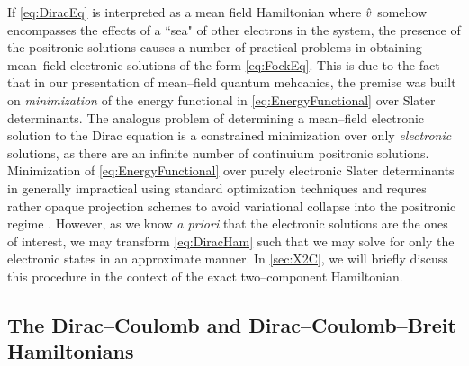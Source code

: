 If \cref{eq:DiracEq} is interpreted as a mean field Hamiltonian where $\hat{v}$ somehow encompasses
the effects of a ``sea" of other electrons in the system, the presence of the positronic solutions
causes a number of practical problems in obtaining mean--field electronic solutions of the form
\cref{eq:FockEq}. This is due to the fact that in our presentation of mean--field quantum mehcanics,
the premise was built on \emph{minimization} of the energy functional in \cref{eq:EnergyFunctional}
over Slater determinants. The analogus problem of determining a mean--field electronic solution
to the Dirac equation is a constrained minimization over only \emph{electronic} solutions, 
as there are an infinite number of continuium positronic solutions. Minimization of 
\cref{eq:EnergyFunctional} over purely electronic Slater determinants in generally impractical using standard 
optimization techniques and requres rather opaque projection schemes to avoid variational
collapse into the positronic regime . However, as we know \emph{a priori} that
the electronic solutions are the ones of interest, we may transform \cref{eq:DiracHam} such that
we may solve for only the electronic states in an approximate manner. In \cref{sec:X2C},
we will briefly discuss this procedure in the context of the exact two--component Hamiltonian.

\subsection{The Dirac--Coulomb and Dirac--Coulomb--Breit Hamiltonians}
\label{sec:DCBHam}

